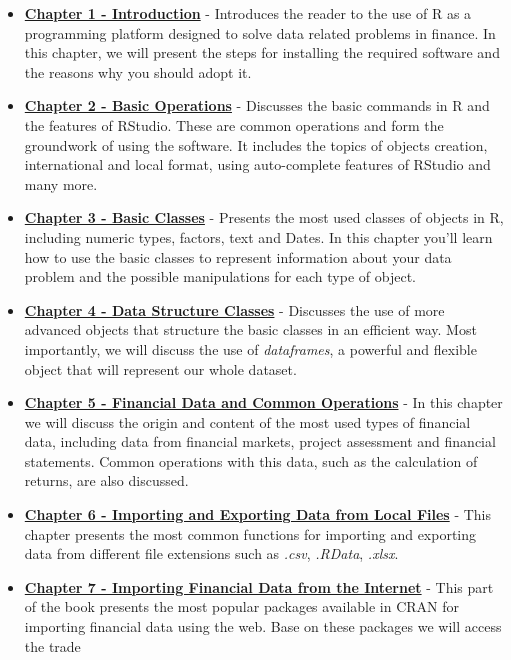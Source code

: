 \documentclass[11pt,]{book}
\begin{document}
\begin{itemize}
\item
  \textbf{\protect\hyperlink{Introduction}{Chapter 1 - Introduction}} -
  Introduces the reader to the use of R as a programming platform
  designed to solve data related problems in finance. In this chapter,
  we will present the steps for installing the required software and the
  reasons why you should adopt it.
\item
  \textbf{\protect\hyperlink{basicoperations}{Chapter 2 - Basic
  Operations}} - Discusses the basic commands in R and the features of
  RStudio. These are common operations and form the groundwork of using
  the software. It includes the topics of objects creation,
  international and local format, using auto-complete features of
  RStudio and many more.
\item
  \textbf{\protect\hyperlink{BasicObjects}{Chapter 3 - Basic Classes}} -
  Presents the most used classes of objects in R, including numeric
  types, factors, text and Dates. In this chapter you'll learn how to
  use the basic classes to represent information about your data problem
  and the possible manipulations for each type of object.
\item
  \textbf{\protect\hyperlink{DataStructureObjects}{Chapter 4 - Data
  Structure Classes}} - Discusses the use of more advanced objects that
  structure the basic classes in an efficient way. Most importantly, we
  will discuss the use of \emph{dataframes}, a powerful and flexible
  object that will represent our whole dataset.
\item
  \textbf{\protect\hyperlink{Financial-data}{Chapter 5 - Financial Data
  and Common Operations}} - In this chapter we will discuss the origin
  and content of the most used types of financial data, including data
  from financial markets, project assessment and financial statements.
  Common operations with this data, such as the calculation of returns,
  are also discussed.
\item
  \textbf{\protect\hyperlink{importing}{Chapter 6 - Importing and
  Exporting Data from Local Files}} - This chapter presents the most
  common functions for importing and exporting data from different file
  extensions such as \emph{.csv}, \emph{.RData}, \emph{.xlsx}.
\item
  \textbf{\protect\hyperlink{importingInternet}{Chapter 7 - Importing
  Financial Data from the Internet}} - This part of the book presents
  the most popular packages available in CRAN for importing financial
  data using the web. Base on these packages we will access the trade

\end{itemize}
\end{document}
